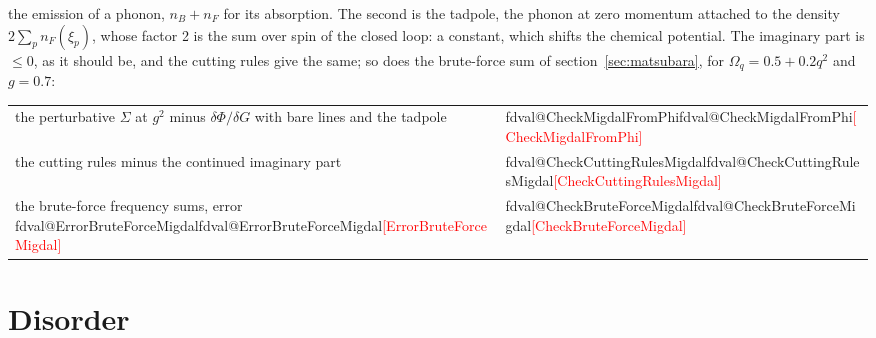 \documentclass[11pt,a4paper]{article}
\makeatletter
\newcommand{\val}[1]{\ifcsname fdval@#1\endcsname\csname fdval@#1\endcsname\else\textcolor{red}{[#1]}\fi}
\makeatother
\begin{document}
the emission of a phonon, $n_B+n_F$ for its absorption. The second is the tadpole, the phonon at zero momentum attached
to the density $2\sum_pn_F(\xi_p)$, whose factor 2 is the sum over spin of the closed loop: a constant, which shifts the
chemical potential. The imaginary part is $\le0$, as it should be, and the cutting rules give the same; so does the
brute-force sum of section~\ref{sec:matsubara}, for $\Omega_q=0.5+0.2q^2$ and $g=0.7$:
\begin{result}
\begin{tabular}{@{}l@{\quad}l@{}}
the perturbative $\Sigma$ at $g^2$ minus $\delta\Phi/\delta G$ with bare lines and the tadpole & \val{CheckMigdalFromPhi}\\
the cutting rules minus the continued imaginary part & \val{CheckCuttingRulesMigdal}\\
the brute-force frequency sums, error \val{ErrorBruteForceMigdal} & \val{CheckBruteForceMigdal}
\end{tabular}
\end{result}

\section{Disorder}\label{sec:disorder}
\end{document}
